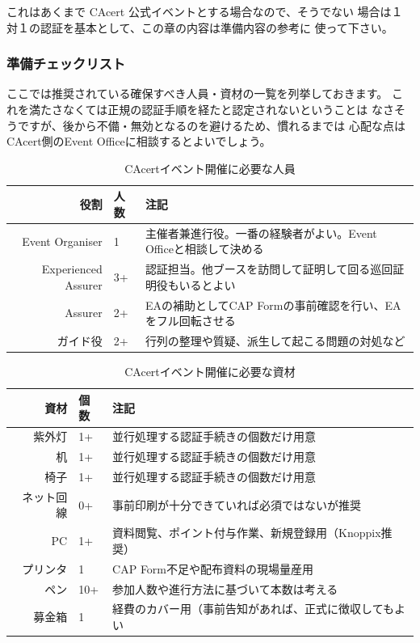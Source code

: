 \documentclass[mingoth,a4paper]{jsarticle}
\begin{document}
これはあくまで CAcert 公式イベントとする場合なので、そうでない
場合は１対１の認証を基本として、この章の内容は準備内容の参考に
使って下さい。

\subsubsection{準備チェックリスト}
ここでは推奨されている確保すべき人員・資材の一覧を列挙しておきます。
これを満たさなくては正規の認証手順を経たと認定されないということは
なさそうですが、後から不備・無効となるのを避けるため、慣れるまでは
心配な点はCAcert側のEvent Officeに相談するとよいでしょう。

\begin{table}[H]
\begin{center}
\begin{tabular}{|r|l|p{25em}|}
\hline
役割 & 人数 & 注記 \\ \hline
Event Organiser & 1
  & 主催者兼進行役。一番の経験者がよい。Event Officeと相談して決める \\ \hline
Experienced Assurer & 3+
  & 認証担当。他ブースを訪問して証明して回る巡回証明役もいるとよい \\ \hline
Assurer & 2+
  & EAの補助としてCAP Formの事前確認を行い、EAをフル回転させる \\ \hline
ガイド役 & 2+
  & 行列の整理や質疑、派生して起こる問題の対処など \\ \hline
\end{tabular}
\end{center}
\caption{CAcertイベント開催に必要な人員}
\end{table}

\begin{table}[H]
\begin{center}
\begin{tabular}{|r|l|p{25em}|}
\hline
資材 & 個数 & 注記 \\ \hline
紫外灯     & 1+  & 並行処理する認証手続きの個数だけ用意 \\ \hline
机         & 1+  & 並行処理する認証手続きの個数だけ用意 \\ \hline
椅子       & 1+  & 並行処理する認証手続きの個数だけ用意 \\ \hline
ネット回線 & 0+  & 事前印刷が十分できていれば必須ではないが推奨 \\ \hline
PC         & 1+  & 資料閲覧、ポイント付与作業、新規登録用（Knoppix推奨） \\ \hline
プリンタ   & 1   & CAP Form不足や配布資料の現場量産用 \\ \hline
ペン       & 10+ & 参加人数や進行方法に基づいて本数は考える \\ \hline
募金箱     & 1   & 経費のカバー用（事前告知があれば、正式に徴収してもよい \\ \hline
\end{tabular}
\end{center}
\caption{CAcertイベント開催に必要な資材}
\end{table}
\end{document}
